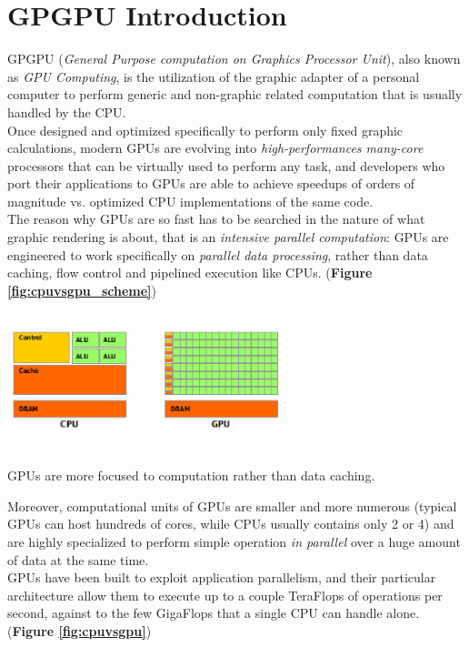 \section{GPGPU Introduction}

GPGPU (\textit{General Purpose computation on Graphics Processor Unit}), also known as \textit{GPU Computing}, is the utilization of the graphic adapter of a personal computer to perform generic and non-graphic related computation that is usually handled by the CPU.\\
Once designed and optimized specifically to perform only fixed graphic calculations, modern GPUs are evolving into \emph{high-performances many-core} processors that can be virtually used to perform any task, and developers who port their applications to GPUs are able to achieve speedups of orders of magnitude vs. optimized CPU implementations of the same code.\cite{GPGPUORG:About}\\
The reason why GPUs are so fast has to be searched in the nature of what graphic rendering is about, that is an \emph{intensive parallel computation}: GPUs are engineered to work specifically on \emph{parallel data processing}, rather than data caching, flow control and pipelined execution like CPUs. (\textbf{Figure \ref{fig:cpuvsgpu_scheme}})

\begin{figurehere}
 \centering
 \includegraphics[width=8cm, height=4cm]{./eps/GPU_CPU_struct.eps}
 \caption{GPUs are more focused to computation rather than data caching.}
 \label{fig:cpuvsgpu_scheme}
\end{figurehere}

Moreover, computational units of GPUs are smaller and more numerous (typical GPUs can host hundreds of cores, while CPUs usually contains only 2 or 4) and are highly specialized to perform simple operation \emph{in parallel} over a huge amount of data at the same time.\\
GPUs have been built to exploit application parallelism, and their particular architecture allow them to execute up to a couple TeraFlops of operations per second, against to the few GigaFlops that a single CPU can handle alone. (\textbf{Figure \ref{fig:cpuvsgpu}})

